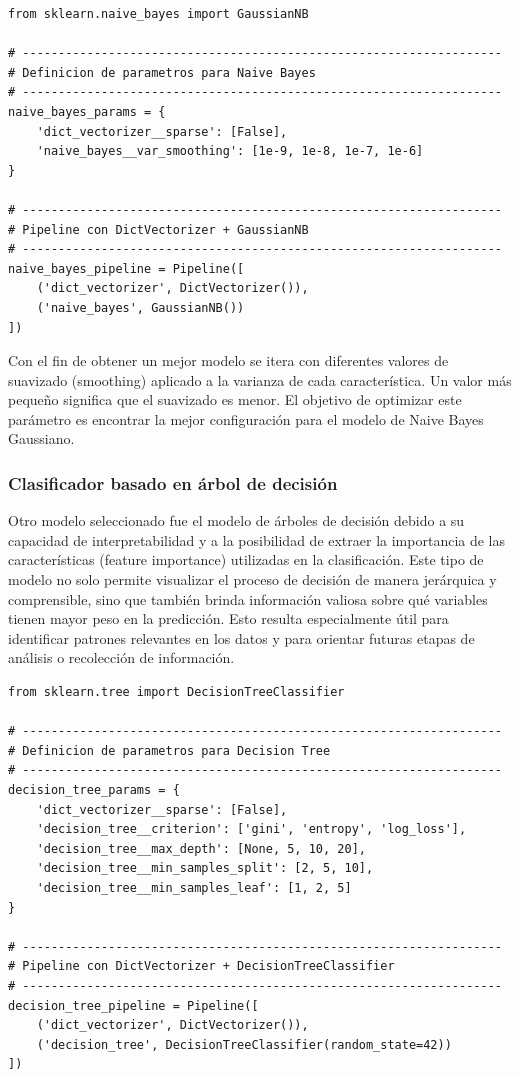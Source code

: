 \documentclass[11pt,a4paper,spanish]{book}
\numberwithin{equation}{chapter}
\numberwithin{figure}{chapter}
\begin{document}
\vspace{5mm}
\begin{lstlisting}
from sklearn.naive_bayes import GaussianNB

# -------------------------------------------------------------------
# Definicion de parametros para Naive Bayes
# -------------------------------------------------------------------
naive_bayes_params = {
    'dict_vectorizer__sparse': [False],
    'naive_bayes__var_smoothing': [1e-9, 1e-8, 1e-7, 1e-6]
}

# -------------------------------------------------------------------
# Pipeline con DictVectorizer + GaussianNB
# -------------------------------------------------------------------
naive_bayes_pipeline = Pipeline([
    ('dict_vectorizer', DictVectorizer()),
    ('naive_bayes', GaussianNB())
])
\end{lstlisting}


Con el fin de obtener un mejor modelo se itera con diferentes valores de suavizado (smoothing) aplicado a la varianza de cada característica. Un valor más pequeño significa que el suavizado es menor.  El objetivo de optimizar este parámetro es encontrar la mejor configuración para el modelo de Naive Bayes Gaussiano.


\subsubsection{Clasificador basado en árbol de decisión}

Otro modelo seleccionado fue el modelo de árboles de decisión debido a su capacidad de interpretabilidad y a la posibilidad de extraer la importancia de las características (feature importance) utilizadas en la clasificación. Este tipo de modelo no solo permite visualizar el proceso de decisión de manera jerárquica y comprensible, sino que también brinda información valiosa sobre qué variables tienen mayor peso en la predicción. Esto resulta especialmente útil para identificar patrones relevantes en los datos y para orientar futuras etapas de análisis o recolección de información.


\vspace{5mm}
\begin{lstlisting}
from sklearn.tree import DecisionTreeClassifier

# -------------------------------------------------------------------
# Definicion de parametros para Decision Tree
# -------------------------------------------------------------------
decision_tree_params = {
    'dict_vectorizer__sparse': [False],
    'decision_tree__criterion': ['gini', 'entropy', 'log_loss'],
    'decision_tree__max_depth': [None, 5, 10, 20],
    'decision_tree__min_samples_split': [2, 5, 10],
    'decision_tree__min_samples_leaf': [1, 2, 5]
}

# -------------------------------------------------------------------
# Pipeline con DictVectorizer + DecisionTreeClassifier
# -------------------------------------------------------------------
decision_tree_pipeline = Pipeline([
    ('dict_vectorizer', DictVectorizer()),
    ('decision_tree', DecisionTreeClassifier(random_state=42))
])
\end{lstlisting}
\end{document}
